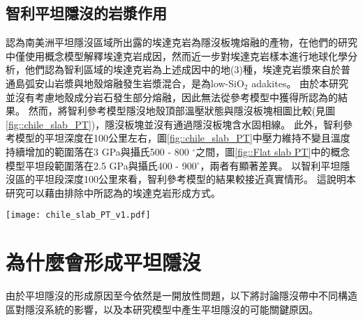 \newpage
\subsection{智利平坦隱沒的岩漿作用}

\citealp{Gutscher2000Bcan}認為南美洲平坦隱沒區域所出露的埃達克岩為隱沒板塊熔融的產物，在他們的研究中僅使用概念模型解釋埃達克岩成因，然而\citealp{kay2002magmatism}近一步對埃達克岩樣本進行地球化學分析，他們認為智利區域的埃達克岩為上述成因中的地(3)種，埃達克岩漿來自於普通島弧安山岩漿與地殼熔融發生岩漿混合，是為low-SiO$_2$ adakites。
由於本研究並沒有考慮地殼成分岩石發生部分熔融，因此無法從參考模型中獲得\citealp{kay2002magmatism}所認為的結果。
然而，將智利參考模型隱沒地殼頂部溫壓狀態與隱沒板塊相圖比較(見圖\ref{fig::chile_slab_PT})，隱沒板塊並沒有通過隱沒板塊含水固相線。
此外，智利參考模型的平坦深度在100公里左右，圖\ref{fig::chile_slab_PT}中壓力維持不變且溫度持續增加的範圍落在3 GPa與攝氏500 - 800 $^{\circ}$之間，圖\ref{fig::Flat slab PT}中\citealp{Gutscher2000Bcan}的概念模型平坦段範圍落在2.5 GPa與攝氏400 - 900$^{\circ}$，兩者有顯著差異。
以智利平坦隱沒區的平坦段深度100公里來看，智利參考模型的結果較接近真實情形。
這說明本研究可以藉由排除\citealp{Gutscher2000Bcan}中所認為的埃達克岩形成方式。

\begin{figure*}[ht!]
    \centering
    \texttt{[image: chile\_slab\_PT\_v1.pdf]}
    \caption[智利參考模型隱沒地殼頂部於40 Myr的溫壓圖]{智利參考模型隱沒地殼頂部於40 Myr的溫壓圖。其中綠線為本研究中玄武岩至榴輝岩的相變條件，橘色線為含水固相線。綠色點為隱沒地殼頂部每2-5公里的溫壓狀態。
    }
    \label{fig::chile_slab_PT}
\end{figure*}

\newpage
\section{為什麼會形成平坦隱沒}
由於平坦隱沒的形成原因至今依然是一開放性問題，以下將討論隱沒帶中不同構造區對隱沒系統的影響，以及本研究模型中產生平坦隱沒的可能關鍵原因。

